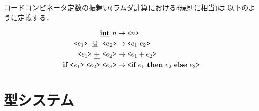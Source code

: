 コードコンビネータ定数の振舞い(ラムダ計算における$\delta$規則に相当)は
以下のように定義する．

\begin{align*}
  \cint~ n &\to \code{n} \\
  \code{e_1}~ \cat~ \code{e_2} &\to \code{e_1~ e_2} \\
  \code{e_1}~ \cPlus~ \code{e_2} &\to \code{e_1 + e_2} \\
  \cif{e_1}{e_2}{e_3} &\to \code{\ift{e_1}{e_2}{e_3}}
\end{align*}
%


\section{型システム}

